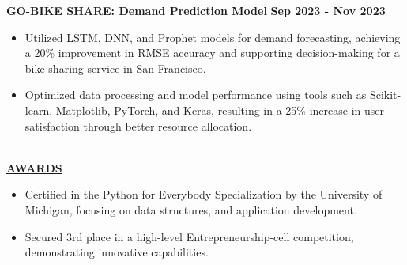 \documentclass{article}
\begin{document}
\begin{itemize}
\end{itemize}
\noindent \textbf{GO-BIKE SHARE: Demand Prediction Model} \textit \hfill \textbf{Sep 2023 - Nov 2023}  
\begin{itemize}[noitemsep,nolistsep,leftmargin=*]
\item {\small Utilized LSTM, DNN, and Prophet models for demand forecasting, achieving a 20\% improvement in RMSE accuracy and supporting decision-making for a bike-sharing service in San Francisco.}
\item {\small Optimized data processing and model performance using tools such as Scikit-learn, Matplotlib, PyTorch, and Keras, resulting in a 25\% increase in user satisfaction through better resource allocation.}
\end{itemize}


\noindent \textbf{\underline{}} \\
\noindent \textbf{\underline{AWARDS}} 
\begin{itemize}[noitemsep,nolistsep,leftmargin=*]
\item {\small  Certified in the Python for Everybody Specialization by the University of Michigan, focusing on data structures, and application development. }
\end{itemize}
\begin{itemize}[noitemsep,nolistsep,leftmargin=*]
\item {\small Secured 3rd place in a high-level Entrepreneurship-cell competition, demonstrating innovative capabilities. }
\end{itemize}

\end{document}
